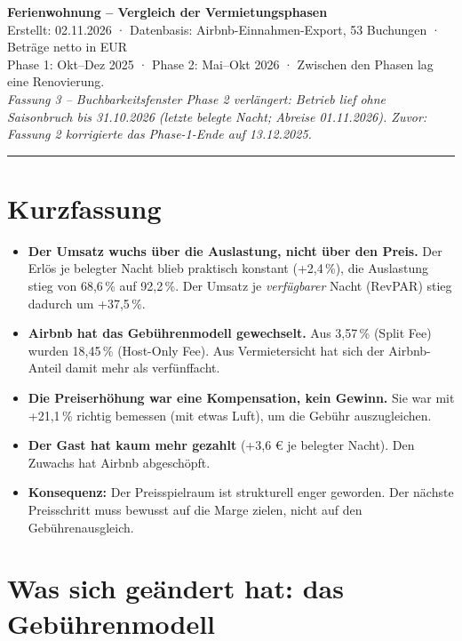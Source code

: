 \documentclass[11pt,a4paper]{article}
\begin{document}
\begin{center}
{\LARGE\bfseries Ferienwohnung – Vergleich der Vermietungsphasen}\\[7pt]
{\small Erstellt: 02.11.2026 · Datenbasis: Airbnb-Einnahmen-Export, 53 Buchungen · Beträge netto in EUR}\\[2pt]
{\small Phase 1: Okt--Dez 2025 · Phase 2: Mai--Okt 2026 · Zwischen den Phasen lag eine Renovierung.}\\[4pt]
{\small\itshape Fassung 3 – Buchbarkeitsfenster Phase 2 verlängert: Betrieb lief ohne Saisonbruch bis 31.10.2026 (letzte belegte Nacht; Abreise 01.11.2026). Zuvor: Fassung 2 korrigierte das Phase-1-Ende auf 13.12.2025.}
\end{center}
\vspace{-2pt}
\hrule
\vspace{8pt}

\section{Kurzfassung}

\begin{itemize}
  \item \textbf{Der Umsatz wuchs über die Auslastung, nicht über den Preis.}
        Der Erlös je belegter Nacht blieb praktisch konstant (+2,4\,\%), die Auslastung
        stieg von 68,6\,\% auf 92,2\,\%. Der Umsatz je \emph{verfügbarer} Nacht (RevPAR)
        stieg dadurch um +37,5\,\%.
  \item \textbf{Airbnb hat das Gebührenmodell gewechselt.} Aus 3,57\,\% (Split Fee)
        wurden 18,45\,\% (Host-Only Fee). Aus Vermietersicht hat sich der Airbnb-Anteil
        damit mehr als verfünffacht.
  \item \textbf{Die Preiserhöhung war eine Kompensation, kein Gewinn.} Sie war mit
        +21,1\,\% richtig bemessen (mit etwas Luft), um die Gebühr auszugleichen.
  \item \textbf{Der Gast hat kaum mehr gezahlt} (+3,6 € je belegter Nacht). Den Zuwachs
        hat Airbnb abgeschöpft.
  \item \textbf{Konsequenz:} Der Preisspielraum ist strukturell enger geworden. Der
        nächste Preisschritt muss bewusst auf die Marge zielen, nicht auf den
        Gebührenausgleich.
\end{itemize}

\section{Was sich geändert hat: das Gebührenmodell}
\end{document}
